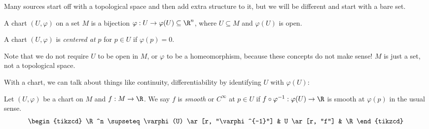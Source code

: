 \documentclass[a4paper]{article}
\begin{document}
Many sources start off with a topological space and then add extra structure to it, but we will be different and start with a bare set.
\begin{defi}[Chart]
  A chart $(U, \varphi)$ on a set $M$ is a bijection $\varphi: U \to \varphi(U) \subseteq \R^n$, where $U \subseteq M$ and $\varphi(U)$ is open.

  A chart $(U, \varphi)$ is \emph{centered at $p$} for $p \in U$ if $\varphi(p) = 0$.
\end{defi}
Note that we do not require $U$ to be open in $M$, or $\varphi$ to be a homeomorphism, because these concepts do not make sense! $M$ is just a set, not a topological space.
\begin{center}
\end{center}
With a chart, we can talk about things like continuity, differentiability by identifying $U$ with $\varphi(U)$:
\begin{defi}
  Let $(U, \varphi)$ be a chart on $M$ and $f: M \to \R$. We say $f$ is \emph{smooth} or $C^\infty$ at $p \in U$ if $f \circ \varphi^{-1}: \varphi(U) \to \R$ is smooth at $\varphi(p)$ in the usual sense.
  \[
    \begin{tikzcd}
      \R^n \supseteq \varphi(U) \ar[r, "\varphi^{-1}"] & U \ar[r, "f"] & \R
    \end{tikzcd}
  \]
\end{defi}
\end{document}
